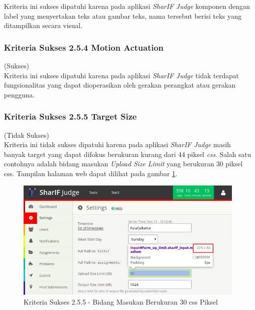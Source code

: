 \documentclass[a4paper,twoside]{article}
\begin{document}
\begin{enumerate}
		Kriteria ini sukses dipatuhi karena pada aplikasi \textit{SharIF Judge} komponen dengan label yang menyertakan teks atau gambar teks, nama tersebut berisi teks yang ditampilkan secara visual.
		
		\subsubsection*{Kriteria Sukses 2.5.4 Motion Actuation}
		\label{subsubsec:kepatuhan_kriteria_2.5.4}
		(Sukses) \\
		
		Kriteria ini sukses dipatuhi karena pada aplikasi \textit{SharIF Judge} tidak terdapat fungsionalitas yang dapat dioperasikan oleh gerakan perangkat atau gerakan pengguna.
		
		\subsubsection*{Kriteria Sukses 2.5.5 Target Size}
		\label{subsubsec:kepatuhan_kriteria_2.5.5}
		(Tidak Sukses) \\
		
		Kriteria ini tidak sukses dipatuhi karena pada aplikasi \textit{SharIF Judge} masih banyak target yang dapat difokus berukuran kurang dari 44 piksel \textit{css}. Salah satu contohnya adalah bidang masukan \textit{Upload Size Limit} yang berukuran 30 piksel css. Tampilan halaman web dapat dilihat pada gambar \ref{fig:kepatuhan_2_5_5}.
		
		\begin{figure}[H]
			\centering  
			\includegraphics[scale=0.5]{kepatuhan_2_5_5}  
			\caption[Kriteria Sukses 2.5.5 - Bidang Masukan Berukuran 30 css Piksel]{Kriteria Sukses 2.5.5 - Bidang Masukan Berukuran 30 css Piksel} 
			\label{fig:kepatuhan_2_5_5} 
		\end{figure}
		

\end{enumerate}
\end{document}
